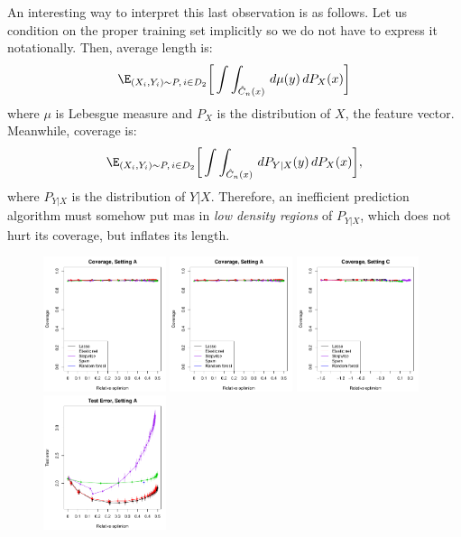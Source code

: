 \documentclass{article}
\begin{document}
An interesting way to interpret this last observation is as follows. Let us
condition on the proper training set implicitly so we do not have to express it
notationally. Then, average length is:       
\[
\E_{(X_i,Y_i) \sim P, \, i \in D_2} \bigg[ \int \int_{\hC_n(x)} \, d\mu(y) \,
dP_X(x) \bigg]  
\]
where $\mu$ is Lebesgue measure and $P_X$ is the distribution of $X$, the
feature vector. Meanwhile, coverage is: 
\[
\E_{(X_i,Y_i) \sim P, \, i \in D_2} \bigg[ \int \int_{\hC_n(x)} \, dP_{Y|X}(y)
\, dP_X(x) \bigg],  
\]
where $P_{Y|X}$ is the distribution of $Y|X$. Therefore, an inefficient
prediction algorithm must somehow put mas in \emph{low density regions} of 
$P_{Y|X}$, which does not hurt its coverage, but inflates its length.   

\begin{figure}[p]
\centering
\includegraphics[width=0.32\textwidth]{fig_sim/A_cov.pdf}
\includegraphics[width=0.32\textwidth]{fig_sim/A_cov.pdf}
\includegraphics[width=0.32\textwidth]{fig_sim/C_cov.pdf} \\
\includegraphics[width=0.32\textwidth]{fig_sim/A_err.pdf}

\end{figure}
\end{document}
